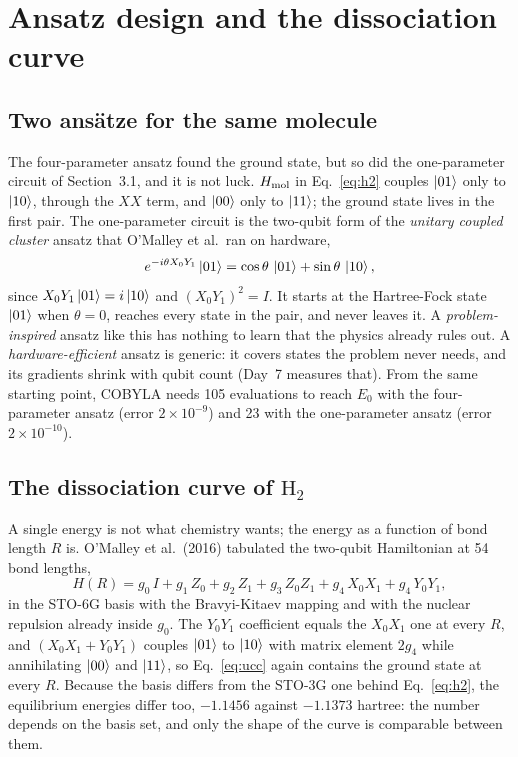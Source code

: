 \documentclass[11pt]{article}
\begin{document}
\section{Ansatz design and the dissociation curve}
\label{sec:ansatz}

\subsection{Two ansätze for the same molecule}

The four-parameter ansatz found the ground state, but so did the one-parameter circuit of Section~3.1, and it is not luck. $H_{\rm mol}$ in Eq.~\eqref{eq:h2} couples $\ket{01}$ only to $\ket{10}$, through the $XX$ term, and $\ket{00}$ only to $\ket{11}$; the ground state lives in the first pair. The one-parameter circuit is the two-qubit form of the \emph{unitary coupled cluster} ansatz that O'Malley et al.\ ran on hardware,
\begin{equation}
e^{-i\theta X_0Y_1}\ket{01} = \cos\theta\,\ket{01} + \sin\theta\,\ket{10},
\label{eq:ucc}
\end{equation}
since $X_0Y_1\ket{01} = i\ket{10}$ and $(X_0Y_1)^2 = I$. It starts at the Hartree-Fock state $\ket{01}$ when $\theta = 0$, reaches every state in the pair, and never leaves it. A \emph{problem-inspired} ansatz like this has nothing to learn that the physics already rules out. A \emph{hardware-efficient} ansatz is generic: it covers states the problem never needs, and its gradients shrink with qubit count (Day~7 measures that). From the same starting point, COBYLA needs 105 evaluations to reach $E_0$ with the four-parameter ansatz (error $2\times10^{-9}$) and 23 with the one-parameter ansatz (error $2\times10^{-10}$).

\subsection{The dissociation curve of \texorpdfstring{$\mathrm{H}_2$}{H2}}

A single energy is not what chemistry wants; the energy as a function of bond length $R$ is. O'Malley et al.\ (2016) tabulated the two-qubit Hamiltonian at 54 bond lengths,
\begin{equation}
H(R) = g_0\,I + g_1\,Z_0 + g_2\,Z_1 + g_3\,Z_0Z_1 + g_4\,X_0X_1 + g_4\,Y_0Y_1 ,
\label{eq:hr}
\end{equation}
in the STO-6G basis with the Bravyi-Kitaev mapping and with the nuclear repulsion already inside $g_0$. The $Y_0Y_1$ coefficient equals the $X_0X_1$ one at every $R$, and $(X_0X_1 + Y_0Y_1)$ couples $\ket{01}$ to $\ket{10}$ with matrix element $2g_4$ while annihilating $\ket{00}$ and $\ket{11}$, so Eq.~\eqref{eq:ucc} again contains the ground state at every $R$. Because the basis differs from the STO-3G one behind Eq.~\eqref{eq:h2}, the equilibrium energies differ too, $-1.1456$ against $-1.1373$ hartree: the number depends on the basis set, and only the shape of the curve is comparable between them.
\end{document}

